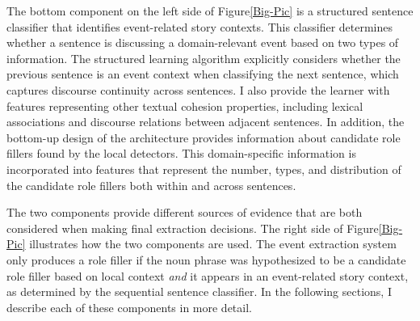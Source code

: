 

The bottom component on the left side of Figure\ref{Big-Pic} is a
structured sentence classifier that identifies event-related story
contexts.  This classifier determines whether a sentence is discussing
a domain-relevant event based on two types of information. The
structured learning algorithm explicitly considers whether the previous
sentence is an event context when classifying the next sentence, which captures discourse continuity
across sentences.  I also provide the learner with features
representing other textual cohesion properties, including lexical
associations and discourse relations between adjacent sentences. In
addition, the bottom-up design of the architecture provides
information about candidate role fillers found by the local detectors.
This domain-specific information is incorporated into features
that represent the number, types, and distribution of the candidate
role fillers both within and across sentences.

The two components provide different sources of evidence that are both
considered when making final extraction decisions. 
The right side of Figure\ref{Big-Pic} illustrates how the two
components are used. The event
extraction system only produces a role filler if the noun phrase was
hypothesized to be a candidate role filler based on local context {\it and} it
appears in an event-related story context, as determined by the
sequential sentence classifier. In the following sections, I describe
each of these components in more detail.

